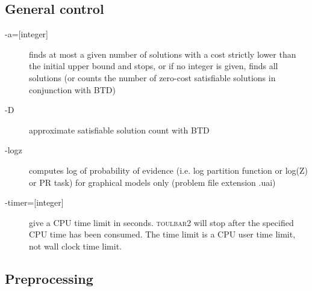 \documentclass{article}
\def\toulbar2{\textsc{toulbar2}}
\begin{document}
\subsection{General control}

\begin{description}
\item[{-a=[integer]}] finds at most a given number of solutions with a cost strictly lower than the initial upper bound and stops, 
or if no integer is given, finds all solutions (or counts the number of zero-cost satisfiable solutions in conjunction with BTD)
\item[{-D}] approximate satisfiable solution count with BTD
\item[{-logz}] computes log of probability of evidence (i.e. log
  partition function or log(Z) or PR task) for graphical models only
  (problem file extension .uai)
\item[{-timer=[integer]}] give a CPU time limit in seconds. \toulbar2
  will stop after the specified CPU time has been consumed. The time
  limit is a CPU user time limit, not wall clock time limit.
\end{description}
 
\subsection{Preprocessing}
\end{document}
